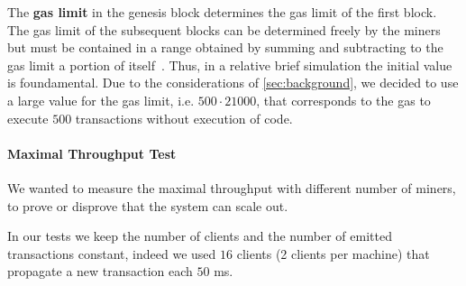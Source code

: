 The \textbf{gas limit} in the genesis block determines the gas limit of the
first block. The gas limit of the subsequent blocks can be determined freely by
the miners but must be contained in a range obtained by summing and subtracting
to the gas limit a portion of itself~\cite{wood2018ethereum}.
Thus, in a relative brief simulation the
initial value is foundamental. Due to the considerations of
\autoref{sec:background}, we decided to use a large value for the gas limit,
i.e. $500 \cdot 21000$, that corresponds to the gas to execute $500$
transactions without execution of code.



\paragraph{Maximal Throughput Test}
We wanted to measure the maximal throughput with different number of miners,
to prove or disprove that the system can scale out.

In our tests we keep the number of clients and the number of emitted 
transactions constant, indeed we used $16$ clients (2 clients per machine) that 
propagate a new  transaction each $50$ ms.
